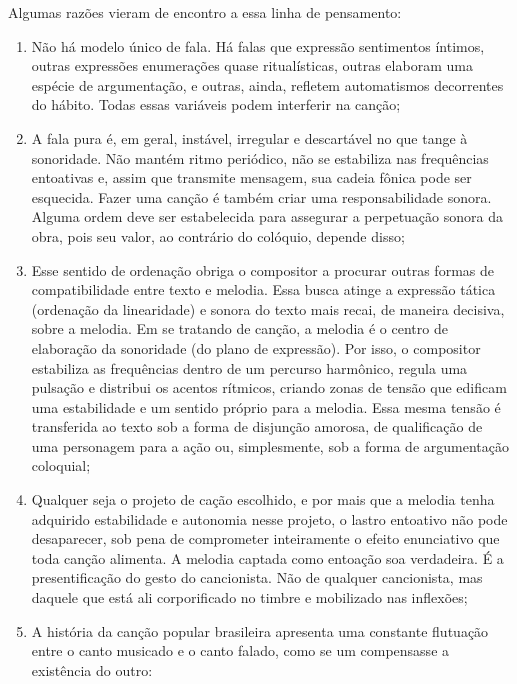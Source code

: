 Algumas razões vieram de encontro a essa linha de pensamento:

\begin{enumerate}[label=\scshape\alph*.]
\item Não há modelo único de fala. Há falas que expressão sentimentos
íntimos, outras expressões enumerações quase ritualísticas, outras
elaboram uma espécie de argumentação, e outras, ainda, refletem
automatismos decorrentes do hábito. Todas essas variáveis podem
interferir na canção;

\item A fala pura é, em geral, instável, irregular e descartável no que
tange à sonoridade. Não mantém ritmo periódico, não se estabiliza nas
frequências entoativas e, assim que transmite mensagem, sua cadeia
fônica pode ser esquecida. Fazer uma canção é também criar uma
responsabilidade sonora. Alguma ordem deve ser estabelecida para
assegurar a perpetuação sonora da obra, pois seu valor, ao contrário do
colóquio, depende disso;

\item Esse sentido de ordenação obriga o compositor a procurar outras
formas de compatibilidade entre texto e melodia. Essa busca atinge a
expressão tática (ordenação da linearidade) e sonora do texto mais
recai, de maneira decisiva, sobre a melodia. Em se tratando de canção, a
melodia é o centro de elaboração da sonoridade (do plano de expressão).
Por isso, o compositor estabiliza as frequências dentro de um percurso
harmônico, regula uma pulsação e distribui os acentos rítmicos, criando
zonas de tensão que edificam uma estabilidade e um sentido próprio para
a melodia. Essa mesma tensão é transferida ao texto sob a forma de
disjunção amorosa, de qualificação de uma personagem para a ação ou,
simplesmente, sob a forma de argumentação coloquial;

\item Qualquer seja o projeto de cação escolhido, e por mais que a melodia
tenha adquirido estabilidade e autonomia nesse projeto, o lastro
entoativo não pode desaparecer, sob pena de comprometer inteiramente o
efeito enunciativo que toda canção alimenta. A melodia captada como
entoação soa verdadeira. É a presentificação do gesto do cancionista.
Não de qualquer cancionista, mas daquele que está ali corporificado no
timbre e mobilizado nas inflexões;

\item A história da canção popular brasileira apresenta uma constante
flutuação entre o canto musicado e o canto falado, como se um
compensasse a existência do outro:


\end{enumerate}
